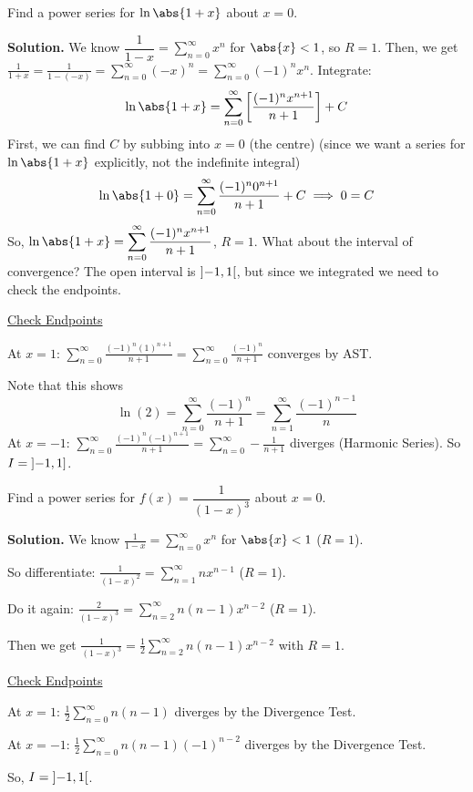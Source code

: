 \begin{Example}{}{}
    Find a power series for $ \ln\abs{1+x} $ about $ x=0 $.

    \textbf{Solution.} We know $ \dfrac{1}{1-x}=\sum\limits_{n=0}^{\infty} x^n $
    for $ \abs{x}<1 $, so $ R=1 $. Then, we get
    $ \displaystyle \frac{1}{1+x} =\frac{1}{1-(-x)}=
        \sum\limits_{n=0}^{\infty} (-x)^n=\sum\limits_{n=0}^{\infty}
        (-1)^n x^n $. Integrate:
    \[ \ln\abs{1+x}=\sum\limits_{n=0}^{\infty} \left[ \frac{(-1)^n x^{n+1}}{n+1} \right]
        +C \]
    First, we can find $ C $ by subbing into $ x= 0 $ (the centre)
    (since we want a series for $ \ln\abs{1+x} $ explicitly, not the indefinite
    integral)
    \[ \ln\abs{1+0}=\sum\limits_{n=0}^{\infty} \frac{(-1)^n 0^{n+1}}{n+1} +C\implies 0=C \]
    So, $ \displaystyle \ln\abs{1+x}=\sum\limits_{n=0}^{\infty} \frac{(-1)^n x^{n+1}}{n+1}  $,
    $ R=1 $. What about the interval of convergence? The open interval is $ \interval[open]{-1}{1} $,
    but since we integrated we need to check the endpoints.

    \underline{Check Endpoints}

    At $ x=1 $: $ \displaystyle \sum\limits_{n=0}^{\infty} \frac{(-1)^n (1)^{n+1}}{n+1}
        =\sum\limits_{n=0}^{\infty} \frac{(-1)^n}{n+1} $ converges by AST\@.

    Note that this shows
    \[ \boxed{\ln(2)=\sum\limits_{n=0}^{\infty}\frac{(-1)^n}{n+1}=\sum\limits_{n=1}^{\infty}
            \frac{(-1)^{n-1}}{n}} \]
    At $ x=-1 $: $ \displaystyle \sum\limits_{n=0}^{\infty}
        \frac{(-1)^n(-1)^{n+1}}{n+1} =\sum\limits_{n=0}^{\infty} -\frac{1}{n+1}   $
    diverges (Harmonic Series). So $ I=\interval[open left]{-1}{1} $.
\end{Example}

\begin{Example}{}{}
    Find a power series for $ f(x)=\dfrac{1}{(1-x)^3} $ about $ x=0 $.

    \textbf{Solution.} We know $ \displaystyle \frac{1}{1-x} =\sum\limits_{n=0}^{\infty} x^n $
    for $ \abs{x}<1 $ ($ R=1 $).

    So differentiate: $ \displaystyle
        \frac{1}{(1-x)^2} =\sum\limits_{n=1}^{\infty} n x^{n-1} $ ($ R=1 $).

    Do it again: $ \displaystyle \frac{2}{(1-x)^3} =\sum\limits_{n=2}^{\infty} n(n-1)x^{n-2} $
    ($ R=1 $).

    Then we get $ \displaystyle\frac{1}{(1-x)^3}=\frac{1}{2}\sum\limits_{n=2}^{\infty} n(n-1)x^{n-2} $
    with $ R=1 $.

    \underline{Check Endpoints}

    At $ x=1 $: $ \displaystyle \frac{1}{2} \sum\limits_{n=0}^{\infty} n(n-1) $
    diverges by the Divergence Test.

    At $ x=-1 $: $ \displaystyle \frac{1}{2}\sum\limits_{n=0}^{\infty} n(n-1)(-1)^{n-2} $
    diverges by the Divergence Test.

    So, $ I=\interval[open]{-1}{1} $.
\end{Example}

